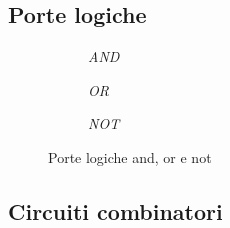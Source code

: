 \subsection{Porte logiche}
\begin{figure}[H]
	\begin{center}
		\begin{subfigure}[c]{0.3\textwidth}
			\begin{center}
			\end{center}
			\caption{\textit{AND}}
		\end{subfigure}
		\begin{subfigure}[c]{0.3\textwidth}
			\begin{center}
			\end{center}
			\caption{\textit{OR}}
		\end{subfigure}
		\begin{subfigure}[c]{0.3\textwidth}
			\begin{center}
			\end{center}
			\caption{\textit{NOT}}
		\end{subfigure}
	\end{center}
	\caption{Porte logiche and, or e not}
\end{figure}
\subsection{Circuiti combinatori}
